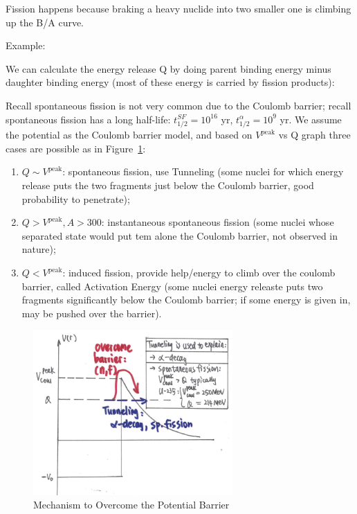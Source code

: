 \documentclass{school-22.101-notes}
\date{December 7, 2011}
\begin{document}
\maketitle

Fission happens because braking a heavy nuclide into two smaller one is climbing up the B/A curve. 

Example:  

We can calculate the energy release Q by doing parent binding energy minus daughter binding energy (most of these energy is carried by fission products): 

Recall spontaneous fission is not very common due to the Coulomb barrier; recall spontaneous fission has a long half-life: $t_{1/2}^{SF} = 10^16$ yr, $t_{1/2}^{\alpha} = 10^9$ yr. We assume the potential as the Coulomb barrier model, and based on $V^{\mathrm{peak}}$ vs Q graph three cases are possible as in Figure~\ref{fission-mechanism}:
\begin{enumerate}
\item $Q \sim V^{\mathrm{peak}}$: spontaneous fission, use Tunneling (some nuclei for which energy release puts the two fragments just below the Coulomb barrier, good probability to penetrate); 
\item $Q > V^{\mathrm{peak}}, A>300$: instantaneous spontaneous fission (some nuclei whose separated state would put tem alone the Coulomb barrier, not observed in nature);
\item $Q < V^{\mathrm{peak}}$: induced fission, provide help/energy to climb over the coulomb barrier, called Activation Energy (some nuclei energy releaste puts two fragments significantly below the Coulomb barrier; if some energy is given in, may be pushed over the barrier). 
\end{enumerate}
\begin{figure}[ht]
   \centering
   \includegraphics[width=3in]{images/ni/fission-mechanism.png}
   \caption{Mechanism to Overcome the Potential Barrier\label{fission-mechanism}}
\end{figure}
\end{document}
